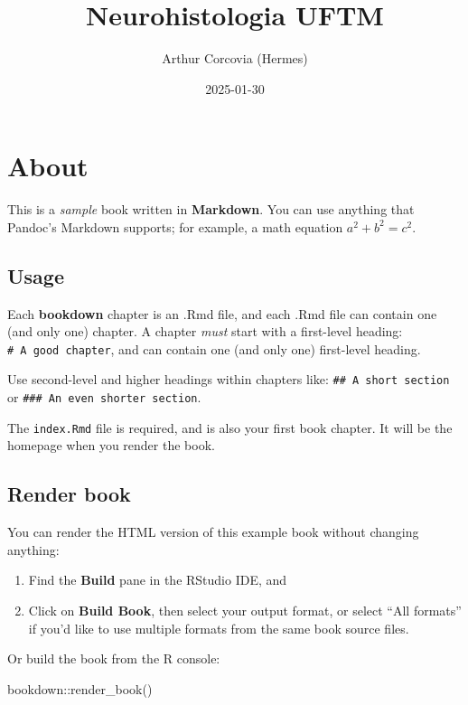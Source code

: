 \documentclass[
]{book}
\title{Neurohistologia UFTM}
\author{Arthur Corcovia (Hermes)}
\date{2025-01-30}
\newenvironment{Shaded}{\begin{snugshade}}{\end{snugshade}}
\newcommand{\FunctionTok}[1]{\textcolor[rgb]{0.00,0.00,0.00}{#1}}
\newcommand{\NormalTok}[1]{#1}
\newcommand{\SpecialCharTok}[1]{\textcolor[rgb]{0.00,0.00,0.00}{#1}}
\theoremstyle{definition}
\theoremstyle{definition}
\theoremstyle{definition}
\theoremstyle{definition}
\theoremstyle{remark}
\begin{document}
\maketitle

{
\setcounter{tocdepth}{1}
\tableofcontents
}
\hypertarget{about}{%
\chapter{About}\label{about}}

This is a \emph{sample} book written in \textbf{Markdown}. You can use anything that Pandoc's Markdown supports; for example, a math equation \(a^2 + b^2 = c^2\).

\hypertarget{usage}{%
\section{Usage}\label{usage}}

Each \textbf{bookdown} chapter is an .Rmd file, and each .Rmd file can contain one (and only one) chapter. A chapter \emph{must} start with a first-level heading: \texttt{\#\ A\ good\ chapter}, and can contain one (and only one) first-level heading.

Use second-level and higher headings within chapters like: \texttt{\#\#\ A\ short\ section} or \texttt{\#\#\#\ An\ even\ shorter\ section}.

The \texttt{index.Rmd} file is required, and is also your first book chapter. It will be the homepage when you render the book.

\hypertarget{render-book}{%
\section{Render book}\label{render-book}}

You can render the HTML version of this example book without changing anything:

\begin{enumerate}
\def\labelenumi{\arabic{enumi}.}
\item
  Find the \textbf{Build} pane in the RStudio IDE, and
\item
  Click on \textbf{Build Book}, then select your output format, or select ``All formats'' if you'd like to use multiple formats from the same book source files.
\end{enumerate}

Or build the book from the R console:

\begin{Shaded}
\begin{Highlighting}[]
\NormalTok{bookdown}\SpecialCharTok{::}\FunctionTok{render\_book}\NormalTok{()}
\end{Highlighting}
\end{Shaded}
\end{document}
